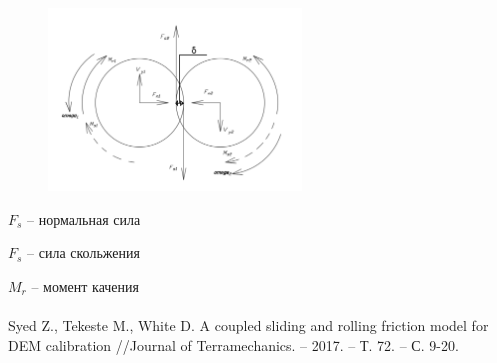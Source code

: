 \documentclass[c]{beamer}  %
\begin{document}
\begin{frame}
\frametitle{\insertsection} 
\framesubtitle{\insertsubsection}

\begin{figure}
\includegraphics[width=0.6\textwidth]{sily}
\end{figure}
$F_s$ -- нормальная сила

$F_s$ -- сила скольжения

$M_r$ -- момент качения
\\ $\quad$ \\
\small Syed Z., Tekeste M., White D. A coupled sliding and rolling friction model for DEM calibration //Journal of Terramechanics. – 2017. – Т. 72. – С. 9-20.
\end{frame}
\end{document}
